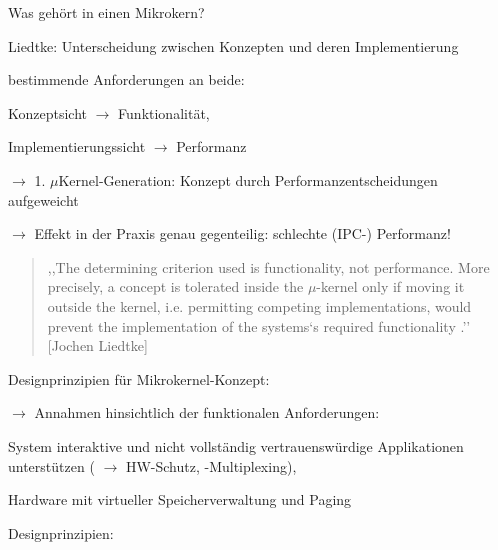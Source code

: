 \documentclass[a4paper]{article}
\begin{document}
\begin{multicols}{3}
    \begin{itemize*}
        \item
        Was gehört in einen Mikrokern?
        \begin{itemize*}
            \item Liedtke: Unterscheidung zwischen Konzepten und deren Implementierung
            \item bestimmende Anforderungen an beide: \begin{itemize*} \item Konzeptsicht $\rightarrow$ Funktionalität, \item Implementierungssicht $\rightarrow$ Performanz \end{itemize*}
            \item $\rightarrow$ 1. $\mu$Kernel-Generation: Konzept durch Performanzentscheidungen aufgeweicht
            \item $\rightarrow$ Effekt in der Praxis genau gegenteilig: schlechte (IPC-) Performanz!
        \end{itemize*}
    \end{itemize*}

    \begin{quote}
        ,,The determining criterion used is functionality, not performance. More
        precisely, a concept is tolerated inside the $\mu$-kernel only if moving it
        outside the kernel, i.e. permitting competing implementations, would
        prevent the implementation of the systems`s required functionality .''
        {[}Jochen Liedtke{]}
    \end{quote}

    Designprinzipien für Mikrokernel-Konzept:

    \begin{itemize*}
        \item
        $\rightarrow$ Annahmen hinsichtlich der funktionalen
        Anforderungen:
    \end{itemize*}

    \begin{enumerate*}
        \item
        System interaktive und nicht vollständig vertrauenswürdige
        Applikationen unterstützen ( $\rightarrow$ HW-Schutz,
        -Multiplexing),
        \item
        Hardware mit virtueller Speicherverwaltung und Paging
    \end{enumerate*}

    Designprinzipien:


\end{multicols}
\end{document}
